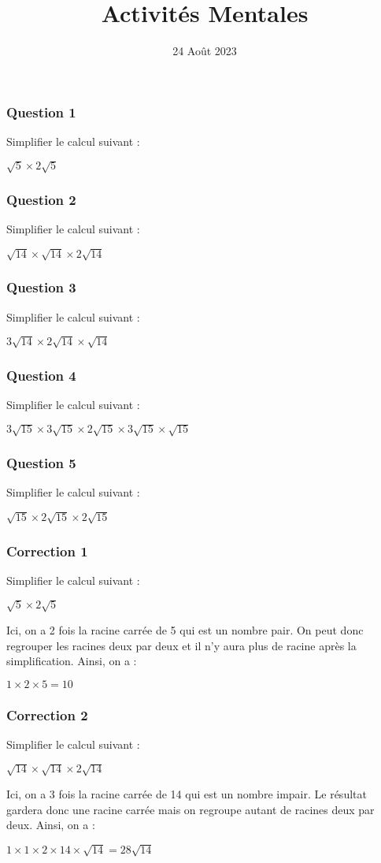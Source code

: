 \documentclass[15pt, mathserif]{beamer}
\title{Activités Mentales}
\date{24 Août 2023}
\begin{document}
\begin{frame}
    \titlepage
\end{frame}

\begin{frame} 
	\frametitle{Question 1}
Simplifier le calcul suivant : 
 
 $\sqrt{5} \times 2\sqrt{5} $\end{frame}


\begin{frame} 
	\frametitle{Question 2}
Simplifier le calcul suivant : 
 
 $\sqrt{14} \times \sqrt{14} \times 2\sqrt{14} $\end{frame}


\begin{frame} 
	\frametitle{Question 3}
Simplifier le calcul suivant : 
 
 $3\sqrt{14} \times 2\sqrt{14} \times \sqrt{14} $\end{frame}


\begin{frame} 
	\frametitle{Question 4}
Simplifier le calcul suivant : 
 
 $3\sqrt{15} \times 3\sqrt{15} \times 2\sqrt{15} \times 3\sqrt{15} \times \sqrt{15} $\end{frame}


\begin{frame} 
	\frametitle{Question 5}
Simplifier le calcul suivant : 
 
 $\sqrt{15} \times 2\sqrt{15} \times 2\sqrt{15} $\end{frame}


\begin{frame}
\vspace{-10mm}
	\frametitle{Correction 1}
Simplifier le calcul suivant : 
 
 $\sqrt{5} \times 2\sqrt{5} $
 
 Ici, on a 2 fois la racine carrée de 5 qui est un nombre pair. On peut donc regrouper les racines deux par deux et il n'y aura plus de racine après la simplification. Ainsi, on a : 
 
 $ 1\times 2\times 5=10$\end{frame}


\begin{frame}
\vspace{-10mm}
	\frametitle{Correction 2}
Simplifier le calcul suivant : 
 
 $\sqrt{14} \times \sqrt{14} \times 2\sqrt{14} $
 
 Ici, on a 3 fois la racine carrée de 14 qui est un nombre impair. Le résultat gardera donc une racine carrée mais on regroupe autant de racines deux par deux. Ainsi, on a : 
 
 $ 1\times 1\times 2\times 14\times \sqrt{14}=28\sqrt{14}$\end{frame}
\end{document}
